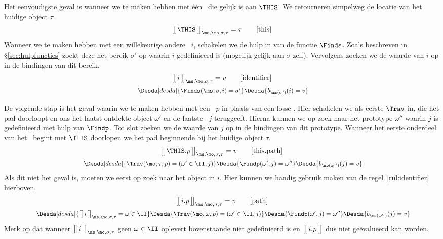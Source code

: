 Het eenvoudigste geval is wanneer we te maken hebben met één \Id\ die gelijk is aan $\THIS$. We retourneren simpelweg de locatie van het huidige object $\tau$.
%
\begin{equation*}
  \Express{\THIS}{\ms,\mo,\sigma,\tau} = \tau
  \tag*{[this]}
\end{equation*}
%
Wanneer we te maken hebben met een willekeurige andere \Id\ $i$, schakelen we de hulp in van de functie $\Finds$. Zoals beschreven in §\ref{sec:hulpfuncties} zoekt deze het bereik $\sigma'$ op waarin $i$ gedefinieerd is (mogelijk gelijk aan $\sigma$ zelf). Vervolgens zoeken we de waarde van $i$ op in de bindingen van dit bereik.
%
\begin{gather*}
  \Express{i}{\ms,\mo,\sigma,\tau} = v
  \tag*{[identifier]}\label{rul:identifier} \\
  \Desdas{
    \Desda[desda]{\Finds(\ms, \sigma, i) = \sigma'}
    \Desda{b_{\ms(\sigma')}(i) = v}
  }
\end{gather*}

De volgende stap is het geval waarin we te maken hebben met een \Path\ $p$ in plaats van een losse \Id. Hier schakelen we als eerste $\Trav$ in, die het pad doorloopt en ons het laatst ontdekte object $\omega'$ en de laatste \Id\ $j$ teruggeeft. Hierna kunnen we op zoek naar het prototype $\omega''$ waarin $j$ is gedefinieerd met hulp van $\Findp$. Tot slot zoeken we de waarde van $j$ op in de bindingen van dit prototype. Wanneer het eerste onderdeel van het \Path\ begint met $\THIS$ doorlopen we het pad beginnende bij het huidige object $\tau$.
%
\begin{gather*}
  \Express{\THIS.p}{\ms,\mo,\sigma,\tau} = v
  \tag*{[this.path]} \\
  \Desdas{
    \Desda[desda]{\Trav(\mo, \tau, p) = (\omega' \in \II, j)}
    \Desda{\Findp(\omega',j) = \omega''}
    \Desda{b_{\mo(\omega'')}(j) = v}
  }
\end{gather*}
%
Als dit niet het geval is, moeten we eerst op zoek naar het object in $i$. Hier kunnen we handig gebruik maken van de regel~\ref{rul:identifier} hierboven.
%
\begin{gather*}
  \Express{i.p}{\ms,\mo,\sigma,\tau} = v
  \tag*{[path]} \\
  \Desdas{
    \Desda[desda]{\Express{i}{\ms,\mo,\sigma,\tau} = \omega \in \II}
    \Desda{\Trav(\mo, \omega, p) = (\omega' \in \II, j)}
    \Desda{\Findp(\omega',j) = \omega''}
    \Desda{b_{\mo(\omega'')}(j) = v}
  }
\end{gather*}
%
Merk op dat wanneer $\Express{i}{\ms,\mo,\sigma,\tau}$ geen $\omega \in \II$ oplevert bovenstaande niet gedefinieerd is en $\big[\!\big[\,i.p\,\big]\!\big]^\text{}_{}$ dus niet geëvalueerd kan worden.

